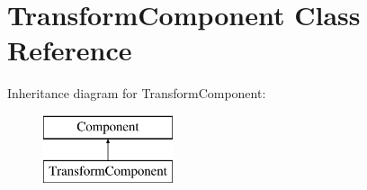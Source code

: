 \hypertarget{class_transform_component}{\section{Transform\+Component Class Reference}
\label{class_transform_component}
}
Inheritance diagram for Transform\+Component\+:\begin{figure}[H]
\begin{center}
\leavevmode
\includegraphics[height=2.000000cm]{class_transform_component}
\end{center}
\end{figure}
